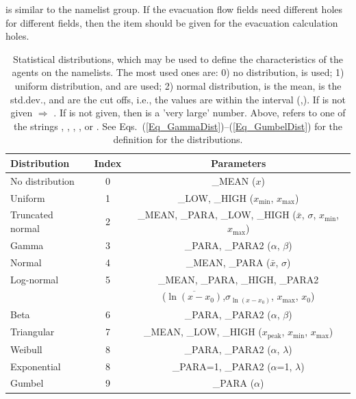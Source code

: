 \documentclass[12pt,a4paper,final,twoside]{stylevk}
\begin{document}
 is similar to the  namelist group.  If the
evacuation flow fields need different holes for different fields, then
the item  should be given for the evacuation
calculation holes.


%
\begin{table}[!tp]
\begin{center}
\caption{Statistical distributions, which may be used to define the
  characteristics of the agents on the  namelists.  The
  most used ones are: 0) no distribution,  is used; 1)
  uniform distribution,  and  are used;
  2) normal distribution,  is the mean, 
  is the std.dev.,  and  are the cut
  offs, i.e., the values are within the interval
  (,).  If  is not given
  $\Rightarrow$ .  If  is not given,
  then  is a 'very large' number.  Above, 
  refers to one of the strings , , ,
  , or .  See
  Eqs.~(\ref{Eq_GammaDist})--(\ref{Eq_GumbelDist}) for the definition for
  the distributions.}\label{Table_StatDists}
\vspace{12pt}
\begin{tabular}{l|c|c} \hline \hline
Distribution     & Index & Parameters \\ \hline 
No distribution  & 0 & \_MEAN ($x$) \\
Uniform          & 1 & \_LOW, \_HIGH ($x_\mathrm{min}$, $x_\mathrm{max}$) \\ 
Truncated normal & 2 & \_MEAN, \_PARA, \_LOW, \_HIGH ($\bar{x}$,
$\sigma$, $x_\mathrm{min}$, $x_\mathrm{max}$)  \\ 
Gamma            & 3 & \_PARA, \_PARA2 ($\alpha$, $\beta$) \\ 
Normal           & 4 & \_MEAN, \_PARA ($\bar{x}$, $\sigma$) \\ 
Log-normal       & 5 & \_MEAN, \_PARA, \_HIGH, \_PARA2 \\  
                 &   & ($\overline{\ln(x-x_0)}$,$\sigma_{\ln(x-x_0)}$,
                 $x_\mathrm{max}$, $x_0$) \\
Beta             & 6 & \_PARA, \_PARA2 ($\alpha$, $\beta$) \\ 
Triangular       & 7 & \_MEAN, \_LOW, \_HIGH ($x_\mathrm{peak}$,
$x_\mathrm{min}$, $x_\mathrm{max}$) \\  
Weibull          & 8 & \_PARA, \_PARA2 ($\alpha$, $\lambda$) \\ 
Exponential      & 8 & \_PARA=1, \_PARA2 ($\alpha$=1, $\lambda$) \\ 
Gumbel           & 9 & \_PARA ($\alpha$) \\ \hline \hline
\end{tabular}
\end{center}
\end{table}
%
\end{document}
